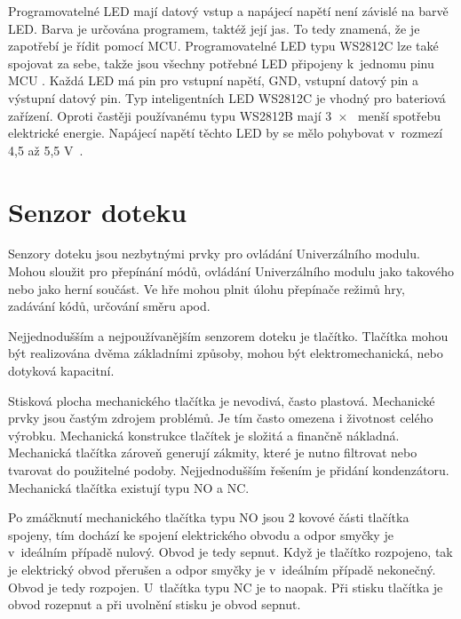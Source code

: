 Programovatelné LED mají datový vstup a napájecí napětí není závislé na barvě LED. 
Barva je určována programem, taktéž její jas. To tedy znamená, že je zapotřebí je řídit 
pomocí MCU. Programovatelné LED typu WS2812C lze také spojovat za sebe, takže jsou všechny potřebné LED připojeny k~jednomu pinu 
MCU \cite{WS2812C_dtsh}. Každá LED má pin pro vstupní napětí, GND, vstupní datový pin a výstupní datový pin. Typ inteligentních LED 
WS2812C je vhodný pro bateriová zařízení. Oproti častěji používanému typu WS2812B mají 3~$\times$~ menší spotřebu elektrické energie. 
Napájecí napětí těchto LED by se mělo pohybovat v~rozmezí 4,5 až 5,5 V~\cite{WS2812C_dtsh}. 

\section{Senzor doteku}
Senzory doteku jsou nezbytnými prvky pro ovládání Univerzálního modulu. Mohou sloužit pro přepínání módů, ovládání Univerzálního modulu
 jako takového nebo jako herní součást. Ve hře mohou plnit úlohu přepínače režimů hry, zadávání kódů, určování směru apod. 

Nejjednodušším a nejpoužívanějším senzorem doteku je tlačítko. 
Tlačítka mohou být realizována dvěma základními způsoby, mohou být elektromechanická, nebo dotyková kapacitní. 

Stisková plocha mechanického tlačítka je nevodivá, často plastová. Mechanické prvky jsou častým zdrojem problémů. Je tím často omezena i 
životnost celého výrobku. Mechanická konstrukce tlačítek je složitá a finančně nákladná. Mechanická tlačítka zároveň generují zákmity, které 
je nutno filtrovat nebo tvarovat do použitelné podoby. Nejjednodušším řešením je přidání kondenzátoru. Mechanická tlačítka existují typu NO 
a NC. 

Po zmáčknutí mechanického tlačítka typu NO jsou 2 kovové části tlačítka spojeny, tím dochází ke spojení elektrického obvodu 
a odpor smyčky je v~ideálním případě nulový. Obvod je tedy sepnut. Když je tlačítko rozpojeno, tak je 
elektrický obvod přerušen a odpor smyčky je v~ideálním případě nekonečný. Obvod je tedy rozpojen. U~tlačítka typu NC je to naopak. Při stisku 
tlačítka je obvod rozepnut a při uvolnění stisku je obvod sepnut. 


